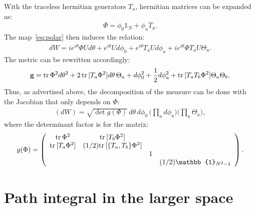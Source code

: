 \documentclass[12pt]{article}
\begin{document}
With the traceless hermitian generators $T_a$,
hermitian matrices can be expanded as:
\begin{align}
  \Phi = \phi_0 \mathbb{1}_N + \phi_a T_a.
\end{align}
The map~\eqref{eq:polar} then induces the relation:
\begin{align}
  dW
  =
  i e^{i\theta} \Phi U d\theta
  +
  e^{i\theta} U d\phi_0
  +
  e^{i\theta} T_a U d\phi_a
  +
  i e^{i\theta} \Phi T_a U \Theta_a.
  \label{eq:expand_dw}
\end{align}
The metric can be rewritten accordingly:
\begin{align}
  \textbf{g}
  =
  {\rm tr}\, \Phi^2  d\theta^2
  +
  2 \, {\rm tr}\,[T_a \Phi^2] d\theta \, \Theta_a
  +
  d\phi_0^2
  +
  \frac{1}{2} d\phi_a^2
  +
  {\rm tr}\, [T_a T_b \Phi^2]  \Theta_a \Theta_b.
\end{align}
Thus, as advertised above,
the decomposition of the measure can be done with the
Jacobian that only depends on $\Phi$:
\begin{align}
  (dW)
  =
  \sqrt{\det g(\Phi)}
  \,
  d\theta
  \,
  d\phi_0
  \,
  \Big(\prod_a d\phi_a\Big)
  \Big(\prod_a \Theta_a \Big),
  \label{eq:measure_w}
\end{align}
where the determinant factor is for the matrix:
\begin{align}
  g(\Phi) =
  \left(
  \begin{array}{c c c c}
    {\rm tr}\, \Phi^2 & {\rm tr}\,[T_b \Phi^2] & & \\
    {\rm tr}\,[T_a \Phi^2] & (1/2){\rm tr}\,[\{T_a, T_b\} \Phi^2] & & \\
                   && 1 & \\
                   && & (1/2)\mathbb{1}_{N^2-1}
  \end{array}
  \right).
\end{align}


\section{Path integral in the larger space}
\label{sec:path_integral}
\end{document}

